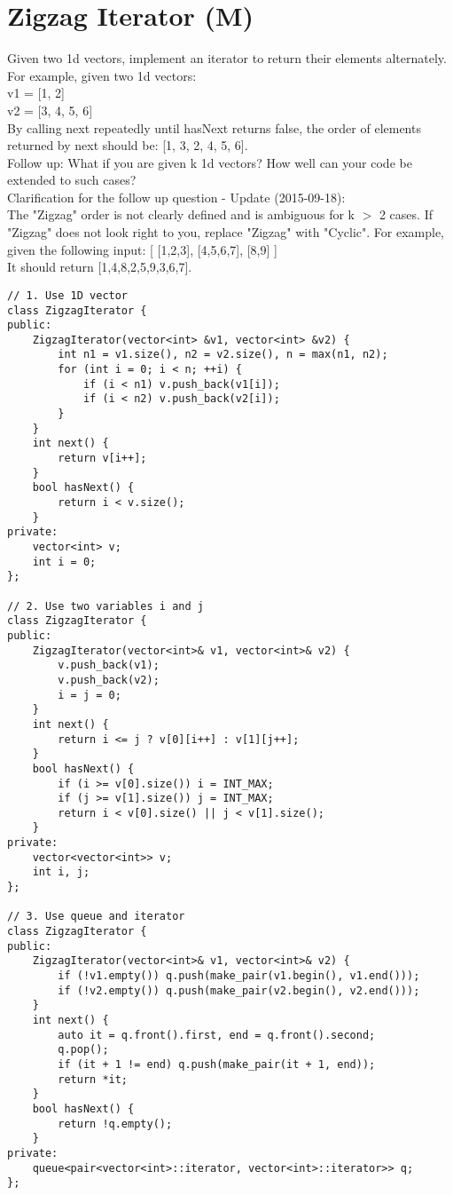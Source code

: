 \section{Zigzag Iterator (M)}
Given two 1d vectors, implement an iterator to return their elements alternately.\\

For example, given two 1d vectors:\\
v1 = [1, 2]\\
v2 = [3, 4, 5, 6]\\
By calling next repeatedly until hasNext returns false, the order of elements returned by next should be: [1, 3, 2, 4, 5, 6].\\

Follow up: What if you are given k 1d vectors? How well can your code be extended to such cases?\\

Clarification for the follow up question - Update (2015-09-18):\\
The "Zigzag" order is not clearly defined and is ambiguous for k $>$ 2 cases. If "Zigzag" does not look right to you, replace "Zigzag" with "Cyclic". For example, given the following input: [ [1,2,3], [4,5,6,7], [8,9] ]\\
It should return [1,4,8,2,5,9,3,6,7].\\

\begin{lstlisting}
// 1. Use 1D vector
class ZigzagIterator {
public:
    ZigzagIterator(vector<int> &v1, vector<int> &v2) {
        int n1 = v1.size(), n2 = v2.size(), n = max(n1, n2);
        for (int i = 0; i < n; ++i) {
            if (i < n1) v.push_back(v1[i]);
            if (i < n2) v.push_back(v2[i]);
        }
    }
    int next() {
        return v[i++];
    }
    bool hasNext() {
        return i < v.size();
    }
private:
    vector<int> v;
    int i = 0;
};

// 2. Use two variables i and j
class ZigzagIterator {
public:
    ZigzagIterator(vector<int>& v1, vector<int>& v2) {
        v.push_back(v1);
        v.push_back(v2);
        i = j = 0;
    }
    int next() {
        return i <= j ? v[0][i++] : v[1][j++];
    }
    bool hasNext() {
        if (i >= v[0].size()) i = INT_MAX;
        if (j >= v[1].size()) j = INT_MAX;
        return i < v[0].size() || j < v[1].size();
    }
private:
    vector<vector<int>> v;
    int i, j;
};

// 3. Use queue and iterator
class ZigzagIterator {
public:
    ZigzagIterator(vector<int>& v1, vector<int>& v2) {
        if (!v1.empty()) q.push(make_pair(v1.begin(), v1.end()));
        if (!v2.empty()) q.push(make_pair(v2.begin(), v2.end()));
    }
    int next() {
        auto it = q.front().first, end = q.front().second;
        q.pop();
        if (it + 1 != end) q.push(make_pair(it + 1, end));
        return *it;
    }
    bool hasNext() {
        return !q.empty();
    }
private:
    queue<pair<vector<int>::iterator, vector<int>::iterator>> q;
};
\end{lstlisting}


